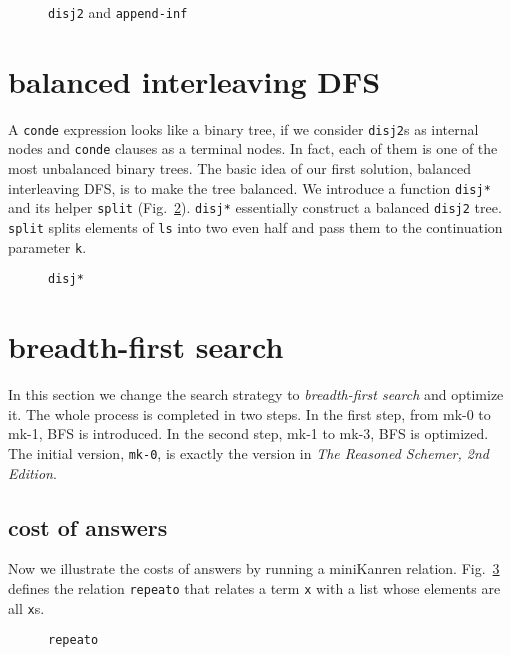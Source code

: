 \documentclass[format=acmlarge, review=true, authordraft=true]{acmart}
\begin{document}
\begin{figure}
  
  \caption{\texttt{disj2} and \texttt{append-inf}}
  \label{disj2-and-append-inf}
\end{figure}
 
\section{balanced interleaving DFS}

A \texttt{conde} expression looks like a binary tree, if we consider 
\texttt{disj2}s as internal nodes and \texttt{conde} clauses as a terminal 
nodes. In fact, each of them is one of the most unbalanced binary trees. The 
basic idea of our first solution, balanced interleaving DFS, is to make the 
tree balanced. We introduce a function \texttt{disj*} and its helper 
\texttt{split} (Fig.~\ref{disj*}). \texttt{disj*} essentially construct a 
balanced \texttt{disj2} tree. \texttt{split} splits elements of \texttt{ls} 
into two even half and pass them to the continuation parameter \texttt{k}.

\begin{figure}
  
  \caption{\texttt{disj*}}
  \label{disj*}
\end{figure}

\section{breadth-first search}

In this section we change the search strategy to \textit{breadth-first search} 
and optimize it. The whole process is completed in two steps. In the first 
step, from mk-0 to mk-1, BFS is introduced. In the second step, mk-1 to mk-3, 
BFS is optimized. The initial version, \texttt{mk-0}, is exactly the version in 
\emph{The Reasoned Schemer, 2nd Edition}.

\subsection{cost of answers}


Now we illustrate the costs of answers by running a miniKanren relation.
Fig.~\ref{def-repeato} defines the relation \texttt{repeato} that 
relates a term \texttt{x} with a list whose elements are all \texttt{x}s.

\begin{figure}
  
  \caption{\texttt{repeato}}
  \label{def-repeato}
\end{figure}
\end{document}
